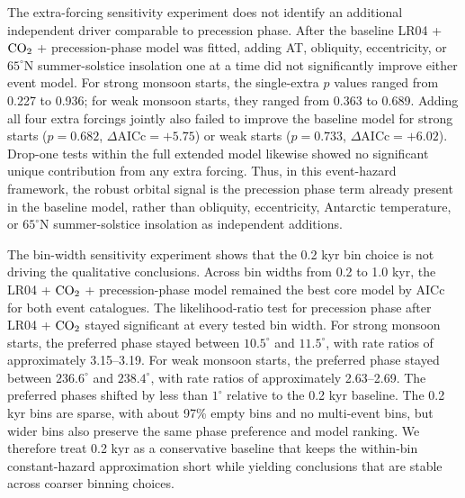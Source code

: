 \documentclass[11pt]{article}
\begin{document}
The extra-forcing sensitivity experiment does not identify an additional independent driver comparable to precession phase. After the baseline LR04 + \(\ce{CO2}\) + precession-phase model was fitted, adding AT, obliquity, eccentricity, or \(65^\circ\)N summer-solstice insolation one at a time did not significantly improve either event model. For strong monsoon starts, the single-extra \(p\) values ranged from 0.227 to 0.936; for weak monsoon starts, they ranged from 0.363 to 0.689. Adding all four extra forcings jointly also failed to improve the baseline model for strong starts (\(p=0.682\), \(\Delta\mathrm{AICc}=+5.75\)) or weak starts (\(p=0.733\), \(\Delta\mathrm{AICc}=+6.02\)). Drop-one tests within the full extended model likewise showed no significant unique contribution from any extra forcing. Thus, in this event-hazard framework, the robust orbital signal is the precession phase term already present in the baseline model, rather than obliquity, eccentricity, Antarctic temperature, or \(65^\circ\)N summer-solstice insolation as independent additions.

The bin-width sensitivity experiment shows that the 0.2 kyr bin choice is not driving the qualitative conclusions. Across bin widths from 0.2 to 1.0 kyr, the LR04 + \(\ce{CO2}\) + precession-phase model remained the best core model by AICc for both event catalogues. The likelihood-ratio test for precession phase after LR04 + \(\ce{CO2}\) stayed significant at every tested bin width. For strong monsoon starts, the preferred phase stayed between \(10.5^\circ\) and \(11.5^\circ\), with rate ratios of approximately 3.15--3.19. For weak monsoon starts, the preferred phase stayed between \(236.6^\circ\) and \(238.4^\circ\), with rate ratios of approximately 2.63--2.69. The preferred phases shifted by less than \(1^\circ\) relative to the 0.2 kyr baseline. The 0.2 kyr bins are sparse, with about 97\% empty bins and no multi-event bins, but wider bins also preserve the same phase preference and model ranking. We therefore treat 0.2 kyr as a conservative baseline that keeps the within-bin constant-hazard approximation short while yielding conclusions that are stable across coarser binning choices.
\end{document}
